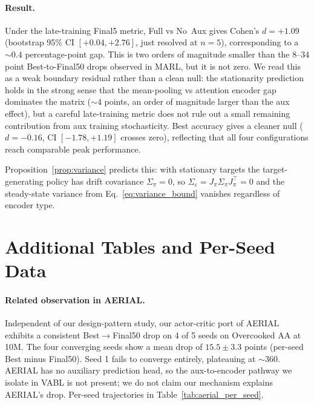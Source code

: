 \documentclass{article}
\theoremstyle{plain}
\theoremstyle{definition}
\theoremstyle{remark}
\begin{document}
\paragraph{Result.}
Under the late-training Final5 metric, Full vs No~Aux gives Cohen's
$d = +1.09$ (bootstrap 95\% CI $[+0.04, +2.76]$, just resolved at
$n{=}5$), corresponding to a $\sim 0.4$ percentage-point gap.
This is two orders of magnitude smaller than the $8$--$34$ point
Best-to-Final50 drops observed in MARL, but it is not zero. We read
this as a weak boundary residual rather than a clean null: the
stationarity prediction holds in the strong sense that the
mean-pooling vs attention encoder gap dominates the matrix
($\sim 4$ points, an order of magnitude larger than the aux effect),
but a careful late-training metric does not rule out a small
remaining contribution from aux training stochasticity. Best
accuracy gives a cleaner null ($d = -0.16$, CI $[-1.78, +1.19]$
crosses zero), reflecting that all four configurations reach
comparable peak performance.

Proposition~\ref{prop:variance} predicts this: with stationary
targets the target-generating policy has drift covariance
$\Sigma_\pi = 0$, so $\Sigma_\varepsilon = J_\pi \Sigma_\pi J_\pi^\top = 0$
and the steady-state variance from Eq.~\eqref{eq:variance_bound}
vanishes regardless of encoder type.


\section{Additional Tables and Per-Seed Data}
\label{app:tables}

\paragraph{Related observation in AERIAL.}
Independent of our design-pattern study, our actor-critic port of
AERIAL~\cite{phan2023attention} exhibits a consistent
Best$\to$Final50 drop on 4 of 5 seeds on Overcooked AA at 10M. The
four converging seeds show a mean drop of $15.5 \pm 3.3$ points
(per-seed Best minus Final50). Seed 1 fails to converge entirely,
plateauing at $\sim$360. AERIAL has no auxiliary prediction head, so
the aux-to-encoder pathway we isolate in VABL is not present; we do
not claim our mechanism explains AERIAL's drop. Per-seed trajectories
in Table~\ref{tab:aerial_per_seed}.
\end{document}
